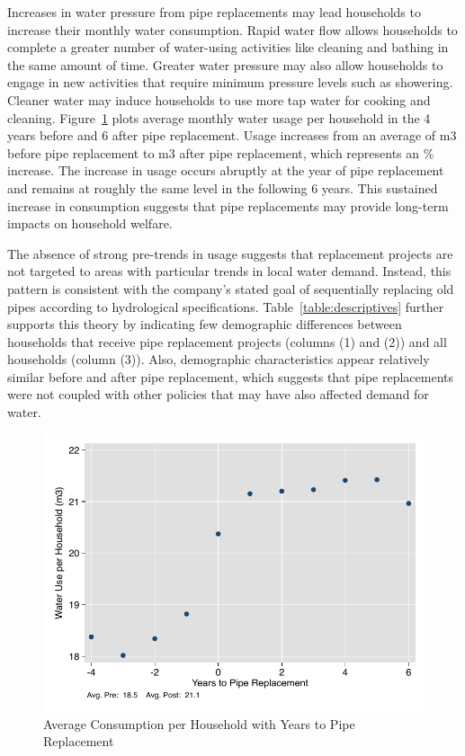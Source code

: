 \documentclass[12pt,table]{article}
\begin{document}
Increases in water pressure from pipe replacements may lead households to increase their monthly water consumption.  Rapid water flow allows households to complete a greater number of water-using activities like cleaning and bathing in the same amount of time.  Greater water pressure may also allow households to engage in new activities that require minimum pressure levels such as showering.  Cleaner water may induce households to use more tap water for cooking and cleaning.  Figure~\ref{figure:pipecons} plots average monthly water usage per household in the 4 years before and 6 after pipe replacement.  Usage increases from an average of m3 before pipe replacement to m3 after pipe replacement, which represents an \unskip\% increase.  The increase in usage occurs abruptly at the year of pipe replacement and remains at roughly the same level in the following 6 years.  This sustained increase in consumption suggests that pipe replacements may provide long-term impacts on household welfare.  

The absence of strong pre-trends in usage suggests that replacement projects are not targeted to areas with particular trends in local water demand.  Instead, this pattern is consistent with the company's stated goal of sequentially replacing old pipes according to hydrological specifications.  Table~\ref{table:descriptives} further supports this theory by indicating few demographic differences between households that receive pipe replacement projects (columns (1) and (2)) and all households (column (3)).  Also, demographic characteristics appear relatively similar before and after pipe replacement, which suggests that pipe replacements were not coupled with other policies that may have also affected demand for water.  

\begin{figure}
\begin{center}
\caption{Average Consumption per Household with Years to Pipe Replacement}\label{figure:pipecons}
\includegraphics[scale=1]{tables/pipe_cons.pdf}
\end{center}
\end{figure}
\end{document}
